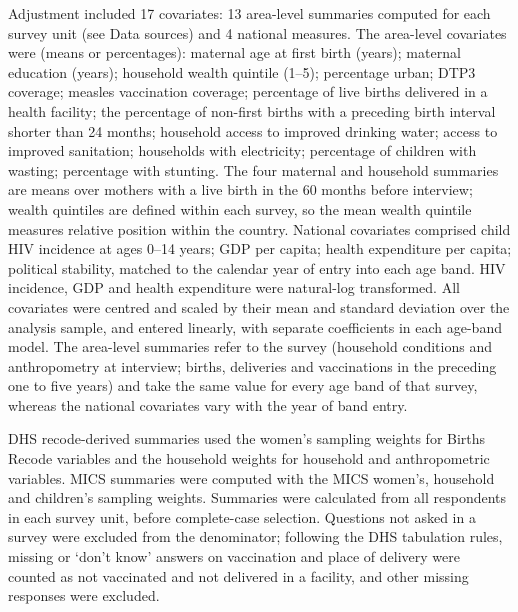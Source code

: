Adjustment included 17 covariates: 13 area-level summaries computed for each survey unit (see Data sources) and 4 national measures. The area-level covariates were (means or percentages): maternal age at first birth (years); maternal education (years); household wealth quintile (1--5); percentage urban; DTP3 coverage; measles vaccination coverage; percentage of live births delivered in a health facility; the percentage of non-first births with a preceding birth interval shorter than 24 months; household access to improved drinking water; access to improved sanitation; households with electricity; percentage of children with wasting; percentage with stunting. The four maternal and household summaries are means over mothers with a live birth in the 60 months before interview; wealth quintiles are defined within each survey, so the mean wealth quintile measures relative position within the country. National covariates comprised child HIV incidence at ages 0--14 years; GDP per capita; health expenditure per capita; political stability, matched to the calendar year of entry into each age band. HIV incidence, GDP and health expenditure were natural-log transformed. All covariates were centred and scaled by their mean and standard deviation over the analysis sample, and entered linearly, with separate coefficients in each age-band model. The area-level summaries refer to the survey (household conditions and anthropometry at interview; births, deliveries and vaccinations in the preceding one to five years) and take the same value for every age band of that survey, whereas the national covariates vary with the year of band entry.

DHS recode-derived summaries used the women's sampling weights for Births Recode variables and the household weights for household and anthropometric variables. MICS summaries were computed with the MICS women's, household and children's sampling weights. Summaries were calculated from all respondents in each survey unit, before complete-case selection. Questions not asked in a survey were excluded from the denominator; following the DHS tabulation rules, missing or `don't know' answers on vaccination and place of delivery were counted as not vaccinated and not delivered in a facility, and other missing responses were excluded.

